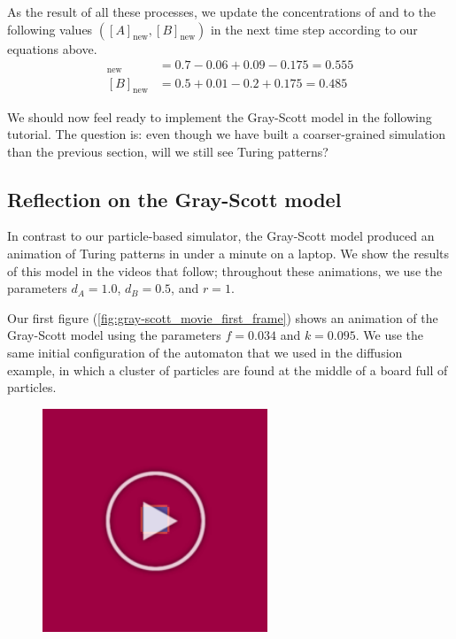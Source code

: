 As the result of all these processes, we update the concentrations of  and  to the following values $([A]_{\text{new}}, [B]_{\text{new}})$ in the next time step according to our equations above.
\begin{align*}
[A]_{\text{new}} & = 0.7 - 0.06 + 0.09 - 0.175 = 0.555\\
[B]_{\text{new}} & = 0.5 + 0.01 - 0.2 + 0.175 = 0.485
\end{align*}

We should now feel ready to implement the Gray-Scott model in the following tutorial. The question is: even though we have built a coarser-grained simulation than the previous section, will we still see Turing patterns?


\FloatBarrier
{}
\subsection{Reflection on the Gray-Scott model}

In contrast to our particle-based simulator, the Gray-Scott model produced an animation of Turing patterns in under a minute on a laptop. We show the results of this model in the videos that follow; throughout these animations, we use the parameters $d_A = 1.0$, $d_B = 0.5$, and $r = 1$.

Our first figure (\autoref{fig:gray-scott_movie_first_frame}) shows an animation of the Gray-Scott model using the parameters  $f = 0.034$ and $k = 0.095$. We use the same initial configuration of the automaton that we used in the diffusion example, in which a cluster of  particles are found at the middle of a board full of  particles.\\

\begin{figure}[h]
\centering
\mySfFamily
\includegraphics[width = 0.6\textwidth]{../images/gray-scott_movie_first_frame.png}
\caption{}
\label{fig:gray-scott_movie_first_frame}
\end{figure}

